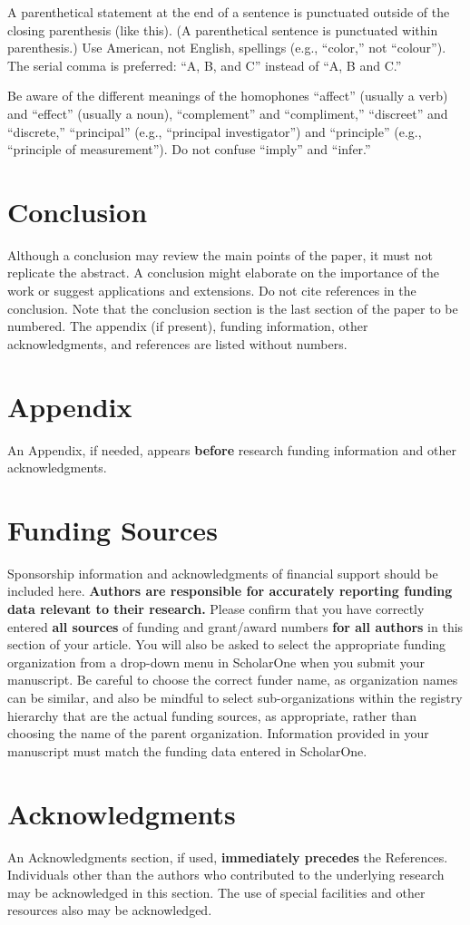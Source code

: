 \documentclass[journal ]{new-aiaa}
\begin{document}
A parenthetical statement at the end of a sentence is punctuated outside of the closing parenthesis (like this). (A parenthetical sentence is punctuated within parenthesis.) Use American, not English, spellings (e.g., “color,” not “colour”). The serial comma is preferred: “A, B, and C” instead of “A, B and C.”

Be aware of the different meanings of the homophones “affect” (usually a verb) and “effect” (usually a noun), “complement” and “compliment,” “discreet” and “discrete,” “principal” (e.g., “principal investigator”) and “principle” (e.g., “principle of measurement”). Do not confuse “imply” and “infer.”

\section{Conclusion}
Although a conclusion may review the main points of the paper, it must not replicate the abstract. A conclusion might elaborate on the importance of the work or suggest applications and extensions. Do not cite references in the conclusion. Note that the conclusion section is the last section of the paper to be numbered. The appendix (if present), funding information, other acknowledgments, and references are listed without numbers.

\section*{Appendix}

An Appendix, if needed, appears \textbf{before} research funding information and other acknowledgments.

\section*{Funding Sources}

Sponsorship information and acknowledgments of financial support should be included here. \textbf{Authors are responsible for accurately reporting funding data relevant to their research.} Please confirm that you have correctly entered \textbf{all sources} of funding and grant/award numbers \textbf{for all authors} in this section of your article. You will also be asked to select the appropriate funding organization from a drop-down menu in ScholarOne when you submit your manuscript. Be careful to choose the correct funder name, as organization names can be similar, and also be mindful to select sub-organizations within the registry hierarchy that are the actual funding sources, as appropriate, rather than choosing the name of the parent organization. Information provided in your manuscript must match the funding data entered in ScholarOne.

\section*{Acknowledgments}
An Acknowledgments section, if used, \textbf{immediately precedes} the References. Individuals other than the authors who contributed to the underlying research may be acknowledged in this section. The use of special facilities and other resources also may be acknowledged. 


\end{document}
